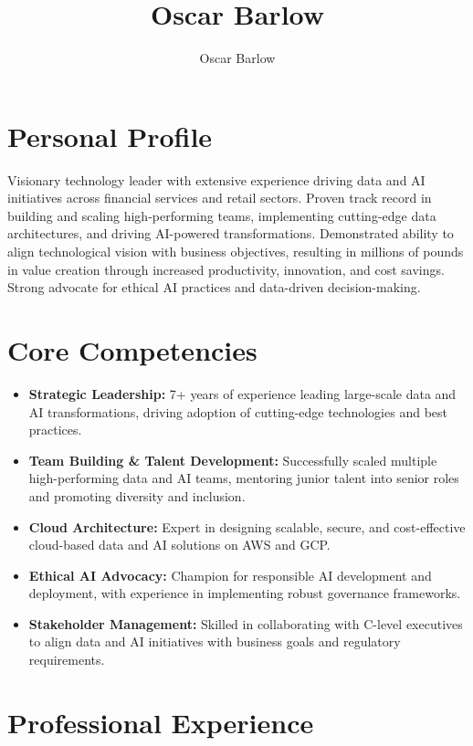 \documentclass[a4paper]{scrartcl}
\author{Oscar Barlow}
\title{Oscar Barlow}
\date{}
\begin{document}
\maketitle

\section*{Personal Profile}
 { %
  \setlength{\parskip}{6pt plus 2pt minus 1pt}
  Visionary technology leader with extensive experience driving data and AI initiatives across financial services and retail sectors. Proven track record in building and scaling high-performing teams, implementing cutting-edge data architectures, and driving AI-powered transformations. Demonstrated ability to align technological vision with business objectives, resulting in millions of pounds in value creation through increased productivity, innovation, and cost savings. Strong advocate for ethical AI practices and data-driven decision-making.
 } %

\section*{Core Competencies}
\begin{itemize}
	\item \textbf{Strategic Leadership:} 7+ years of experience leading large-scale data and AI transformations, driving adoption of cutting-edge technologies and best practices.
	\item \textbf{Team Building \& Talent Development:} Successfully scaled multiple high-performing data and AI teams, mentoring junior talent into senior roles and promoting diversity and inclusion.
	\item \textbf{Cloud Architecture:} Expert in designing scalable, secure, and cost-effective cloud-based data and AI solutions on AWS and GCP.
	\item \textbf{Ethical AI Advocacy:} Champion for responsible AI development and deployment, with experience in implementing robust governance frameworks.
	\item \textbf{Stakeholder Management:} Skilled in collaborating with C-level executives to align data and AI initiatives with business goals and regulatory requirements.
\end{itemize}

\section*{Professional Experience}
\end{document}
